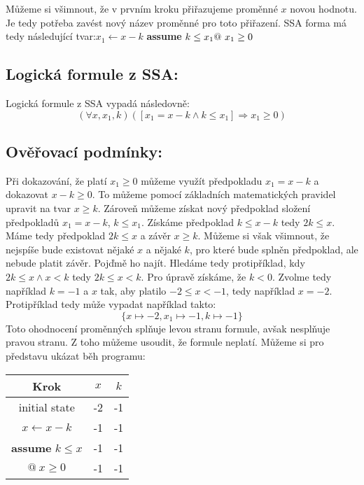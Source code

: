 \documentclass{article}
\begin{document}
Můžeme si všimnout, že v prvním kroku přiřazujeme proměnné $x$ novou hodnotu. Je tedy potřeba zavést nový název proměnné pro toto přiřazení. SSA forma má tedy následující tvar:\newline\newline $x_1 \leftarrow x - k$ \newline \textbf{assume} $k \leq x_1 \newline @ \ x_1 \geq 0$

\subsection{Logická formule z SSA:}

Logická formule z SSA vypadá následovně:
$$ (\forall x, x_1, k)([x_1 = x - k \wedge k \leq x_1] \Rightarrow x_1 \geq 0) $$

\subsection{Ověřovací podmínky:}
Při dokazování, že platí $x_1 \geq 0$ můžeme využít předpokladu $x_1 = x - k$ a dokazovat $ x - k \geq 0$. To můžeme pomocí základních matematických pravidel upravit na tvar $x \geq k$. Zároveň můžeme získat nový předpoklad složení předpokladů $x_1 = x - k$, $k \leq x_1$. Získáme předpoklad $k \leq x - k$ tedy $2k \leq x$. Máme tedy předpoklad $2k \leq x $ a závěr $ x \geq k$. Můžeme si však všimnout, že nejspíše bude existovat nějaké $x$ a nějaké $k$, pro které bude splněn předpoklad, ale nebude platit závěr. Pojďmě ho najít. Hledáme tedy protipříklad, kdy $2k \leq x \wedge x < k$ tedy $2k \leq x < k$. Pro úpravě získáme, že $k < 0$. Zvolme tedy například $k = -1$ a $x$ tak, aby platilo $-2 \leq x < -1$, tedy například $x = -2$. Protipříklad tedy může vypadat například takto:
$$\{x \mapsto -2, x_1 \mapsto -1, k \mapsto -1 \}$$
Toto ohodnocení proměnných splňuje levou stranu formule, avšak nesplňuje pravou stranu. Z toho můžeme usoudit, že formule neplatí. Můžeme si pro představu ukázat běh programu:

\begin{table}[H]\centering

\begin{tabular}{|c|c|c|}
    
        \hline \textbf{Krok} & $x$ & $k$ \\ \hline \hline
        initial state & -2 & -1 \\ \hline
        $x \leftarrow x - k$ & -1 & -1 \\ \hline
        \textbf{assume} $k \leq x$ & -1 & -1 \\ \hline
        $@ \ x \geq 0$ & -1 & -1 \\ \hline
    	
    	\end{tabular}
\end{table}
\end{document}
